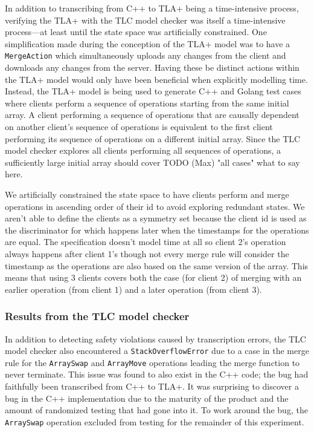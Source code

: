 \documentclass{vldb}
\begin{document}
In addition to transcribing from C++ to TLA+ being a time-intensive process, verifying the TLA+ with the TLC model checker was itself a time-intensive process---at least until the state space was artificially constrained. One simplification made during the conception of the TLA+ model was to have a \texttt{MergeAction} which simultaneously uploads any changes from the client and downloads any changes from the server. Having these be distinct actions within the TLA+ model would only have been beneficial when explicitly modelling time. Instead, the TLA+ model is being used to generate C++ and Golang test cases where clients perform a sequence of operations starting from the same initial array. A client performing a sequence of operations that are causally dependent on another client's sequence of operations is equivalent to the first client performing its sequence of operations on a different initial array. Since the TLC model checker explores all clients performing all sequences of operations, a sufficiently large initial array should cover TODO (Max) "all cases" what to say here.

We artificially constrained the state space to have clients perform and merge operations in ascending order of their id to avoid exploring redundant states. We aren't able to define the clients as a symmetry set because the client id is used as the discriminator for which happens later when the timestamps for the operations are equal. The specification doesn't model time at all so client 2's operation always happens after client 1's though not every merge rule will consider the timestamp as the operations are also based on the same version of the array. This means that using 3 clients covers both the case (for client 2) of merging with an earlier operation (from client 1) and a later operation (from client 3).

\subsubsection{Results from the TLC model checker}

In addition to detecting safety violations caused by transcription errors, the TLC model checker also encountered a \texttt{StackOverflowError} due to a case in the merge rule for the \texttt{ArraySwap} and \texttt{ArrayMove} operations leading the merge function to never terminate. This issue was found to also exist in the C++ code; the bug had faithfully been transcribed from C++ to TLA+. It was surprising to discover a bug in the C++ implementation due to the maturity of the product and the amount of randomized testing that had gone into it. To work around the bug, the \texttt{ArraySwap} operation excluded from testing for the remainder of this experiment.
\end{document}
